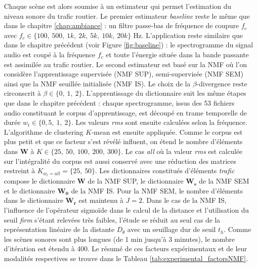 Chaque scène est alors soumise à un estimateur qui permet l'estimation du niveau sonore du trafic routier. 
Le premier estimateur \textit{baseline} reste le même que dans le chapitre \ref{chap:ambiance} : un filtre passe-bas de fréquence de coupure $f_c$ avec $f_c \in \lbrace 100,~500,~1k,~2k,~5k,~10k,~20k \rbrace$ Hz. L'application reste similaire que dans le chapitre précédent (voir Figure \ref{fig:baseline}) : le spectrogramme du signal audio est coupé à la fréquence $f_c$ et toute l'énergie située dans la bande passante est assimilée au trafic routier.
Le second estimateur est basé sur la NMF où l'on considère l'apprentissage supervisée (NMF SUP), semi-supervisée (NMF SEM) ainsi que la NMF seuillée initialisée (NMF IS). Le choix de la $\beta$-divergence reste circonscrit à $\beta \in \lbrace 0,~1,~2 \rbrace$.
L'apprentissage du dictionnaire suit les même étapes que dans le chapitre précédent : chaque spectrogramme, issus des 53 fichiers audio constituant le corpus d'apprentissage, est découpé en trame temporelle de durée $w_t \in \lbrace 0,5,~1,~2 \rbrace$. Les valeurs \textit{rms} sont ensuite calculées selon la fréquence. L'algorithme de clustering $K$-mean est ensuite appliquée. Comme le corpus est plus petit et que ce facteur s'est révélé influent, on étend le nombre d'éléments dans $\mathbf{W}$ à $K \in \lbrace 25,~50,~100,~200,~ 300 \rbrace$. Le cas \textit{all} où la valeur \textit{rms} est calculée sur l'intégralité du corpus est aussi conservé avec une réduction des matrices restreint à $K_{w_t = all} = \lbrace 25,~50 \rbrace$. Les dictionnaires constitués d'éléments \textit{trafic} compose le dictionnaire $\mathbf{W}$ de la NMF SUP, le dictionnaire $\mathbf{W_s}$ de la NMF SEM et le dictionnaire $\mathbf{W_0}$ de la NMF IS.
Pour la NMF SEM, le nombre d'éléments dans le dictionnaire $\mathbf{W_r}$ est maintenu à $J = 2$.
Dans le cas de la NMF IS, l'influence de l'opérateur sigmoïde dans le calcul de la distance et l'utilisation du seuil \textit{firm} s'étant relevées très faibles, l'étude se réduit au seul cas de la représentation linéaire de la distante $D_{\theta}$ avec un seuillage dur de seuil $t_h$.
Comme les scènes sonores sont plus longues (de 1 min jusqu'à 3 minutes), le nombre d'itération est étendu à 400. 
Le résumé de ces facteurs expérimentaux et de leur modalités respectives se trouve dans le Tableau \ref{tab:experimental_factorsNMF}.

